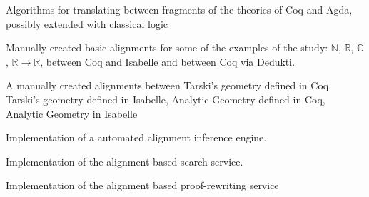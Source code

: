 \begin{workpackage}
\begin{wpdelivs}
  \begin{wpdeliv}[due=24,miles=???,id=prooftheoretical,dissem=PU,nature=DEM,lead=Lee]
    {Algorithms for translating between fragments of the theories of
      Coq and Agda, possibly extended with classical logic}
  \end{wpdeliv}
  \begin{wpdeliv}[due=24,miles=???,id=aligningnumbers,dissem=PU,nature=DEM,lead=Str]
    {Manually created basic alignments for some of the examples of the
      study: $\mathbb{N}$, $\mathbb{R}$, $\mathbb{C}$, $\mathbb{R}
      \rightarrow \mathbb{R}$, between Coq and Isabelle and between
      Coq via Dedukti.}
  \end{wpdeliv}
  \begin{wpdeliv}[due=36,miles=startup,id=aligninggeometries,dissem=PU,nature=DEM,lead=Bel]
    {A manually created alignments between Tarski's geometry defined
      in Coq, Tarski's geometry defined in Isabelle, Analytic Geometry
      defined in Coq, Analytic Geometry in Isabelle}
  \end{wpdeliv}
  \begin{wpdeliv}[due=24,miles=startup,id=automatedalignment,dissem=PU,nature=DEM,lead=Imt]
    {Implementation of a automated alignment inference engine.}
  \end{wpdeliv}
  \begin{wpdeliv}[due=48,miles=???,id=alignsearch,dissem=PU,nature=DEM,lead=Fau]
    {Implementation of the alignment-based search service.}
  \end{wpdeliv}
  \begin{wpdeliv}[due=48,miles=???,id=alignproofrewr,dissem=PU,nature=DEM,lead=Bol]
    {Implementation of the alignment based proof-rewriting service}
  \end{wpdeliv}

\end{wpdelivs}
\end{workpackage}

